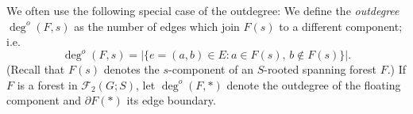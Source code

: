 \documentclass{amsart}
\theoremstyle{definition}
\newcommand{\forests}{\mathcal{F}}
\newcommand{\degout}{\deg^o}
\begin{document}
We often use the following special case of the outdegree: 
We define the {\em outdegree} $\degout(F,s)$ as the number of edges which join $F(s)$ to a different component; i.e.
\begin{equation}
\label{eq:outdeg-forest}
	\degout(F,s) = |\{ e = (a,b) \in E : a \in F(s),\, b \not\in F(s)\}|.
\end{equation}
(Recall that $F(s)$ denotes the $s$-component of an $S$-rooted spanning forest $F$.)
If $F$ is a forest in $\forests_2(G;S)$, let $\degout(F,*)$ denote the outdegree of the floating component
and $\partial F(*)$ its edge boundary.
\end{document}
